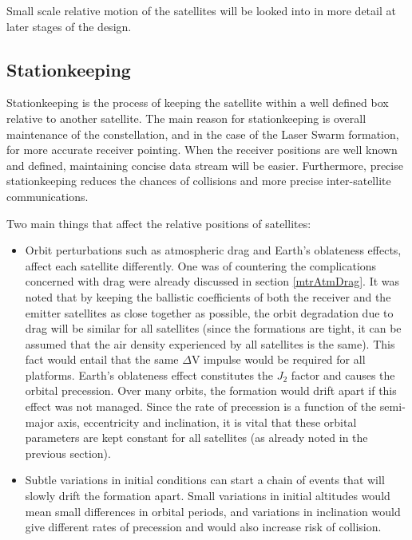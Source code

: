 Small scale relative motion of the satellites will be looked into in more detail at later stages of the design.

\subsection{Stationkeeping}
\label{mtrSwarmStationkeeping}

Stationkeeping is the process of keeping the satellite within a well defined box relative to another satellite. The main reason for stationkeeping is overall maintenance of the constellation, and in the case of the Laser Swarm formation, for more accurate receiver pointing. When the receiver positions are well known and defined, maintaining concise data stream will be easier. Furthermore, precise stationkeeping reduces the chances of collisions and more precise inter-satellite communications.

Two main things that affect the relative positions of satellites:
\begin{itemize}
	\item Orbit perturbations such as atmospheric drag and Earth's oblateness effects, affect each satellite differently. One was of countering the complications concerned with drag were already discussed in section \ref{mtrAtmDrag}. It was noted that by keeping the ballistic coefficients of both the receiver and the emitter satellites as close together as possible, the orbit degradation due to drag will be similar for all satellites (since the formations are tight, it can be assumed that the air density experienced by all satellites is the same). This fact would entail that the same $\Delta$V impulse would be required for all platforms. Earth's oblateness effect constitutes the $J_2$ factor and causes the orbital precession. Over many orbits, the formation would drift apart if this effect was not managed. Since the rate of precession is a function of the semi-major axis, eccentricity and inclination, it is vital that these orbital parameters are kept constant for all satellites (as already noted in the previous section).
	\item Subtle variations in initial conditions can start a chain of events that will slowly drift the formation apart. Small variations in initial altitudes would mean small differences in orbital periods, and variations in inclination would give different rates of precession and would also increase risk of collision.
\end{itemize}

